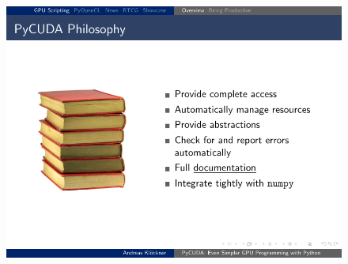 \documentclass[]{beamer}
\begin{document}
\begin{frame}
{\begin{columns}
{\begin{column}{.3\textwidth}
\begin{figure}
\begin{minipage}{0.65\textwidth}
                        \includegraphics[width=1.2\textwidth]{pics/pycuda_philosophy}
                    \end{minipage}
                \end{figure}
            \end{column}
            }
        \end{columns}
        }
\end{frame}

\end{document}
